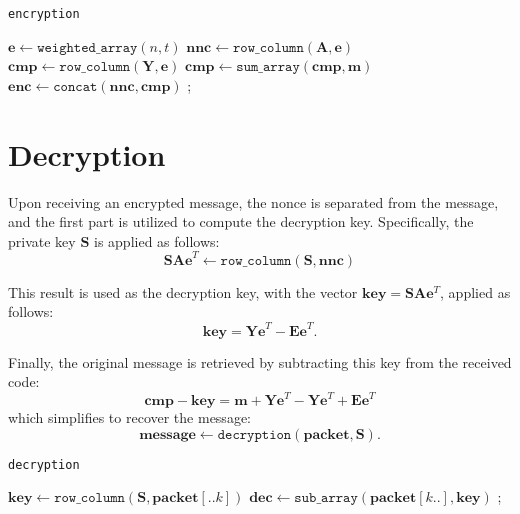 \begin{algorithm}[H]
\caption{\texttt{encryption}}
\label{enc}

\DontPrintSemicolon
\SetStartEndCondition{ }{}{}
\AlgoDontDisplayBlockMarkers\SetAlgoNoEnd\SetAlgoNoLine

$\mathbf{e} \leftarrow \texttt{weighted\_array}(n, t)$\;
$\mathbf{nnc} \leftarrow \texttt{row\_column}(\mathbf{A}, \mathbf{e})$\;
$\mathbf{cmp} \leftarrow \texttt{row\_column}(\mathbf{Y}, \mathbf{e})$\;
$\mathbf{cmp} \leftarrow \texttt{sum\_array}(\mathbf{cmp}, \mathbf{m})$\;
$\mathbf{enc} \leftarrow \texttt{concat}(\mathbf{nnc}, \mathbf{cmp})$ 
;
\end{algorithm}

\section{Decryption}
Upon receiving an encrypted message, the nonce is separated from the message, and the first part is utilized to compute the decryption key. Specifically, the private key $\mathbf{S}$ is applied as follows:
\[
\mathbf{SAe}^T \leftarrow \texttt{row\_column}(\mathbf{S}, \mathbf{nnc})
\]

This result is used as the decryption key, with the vector $\mathbf{key} = \mathbf{SA}\mathbf{e}^T$, applied as follows: \[\mathbf{key} = \mathbf{Ye}^T - \mathbf{Ee}^T.\]

Finally, the original message is retrieved by subtracting this key from the received code:
\[
\mathbf{cmp} - \mathbf{key} = \mathbf{m} + \mathbf{Ye}^T - \mathbf{Ye}^T + \mathbf{Ee}^T
\]
which simplifies to recover the message:
\[
\mathbf{message} \leftarrow \texttt{decryption}(\mathbf{packet}, \mathbf{S}).
\]

\begin{algorithm}[H]
\caption{\texttt{decryption}}
\label{dec}

\DontPrintSemicolon
\SetStartEndCondition{ }{}{}
\AlgoDontDisplayBlockMarkers\SetAlgoNoEnd\SetAlgoNoLine

$\mathbf{key} \leftarrow \texttt{row\_column}(\mathbf{S}, \mathbf{packet}[..k])$ 
$\mathbf{dec} \leftarrow \texttt{sub\_array}(\mathbf{packet}[k..], \mathbf{key})$ 
;
\end{algorithm}

